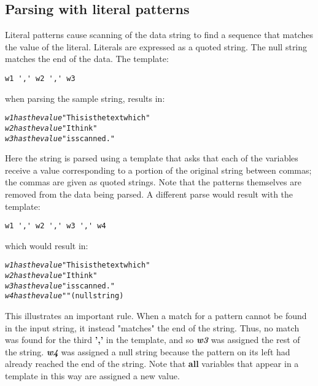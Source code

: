 \subsection{Parsing with literal patterns}
\index{,}
\index{,}
 Literal patterns cause scanning of the data string to find a
sequence that matches the value of the literal.  Literals are expressed
as a quoted string.  The null string matches the end of the data.
 The template:
\begin{lstlisting}
w1 ',' w2 ',' w3
\end{lstlisting}
when parsing the sample string, results in:
\begin{alltt}
\emph{w1} \emph{has the value} "This is  the text which"
\emph{w2} \emph{has the value} " I think"
\emph{w3} \emph{has the value} "  is scanned."
\end{alltt}
 Here the string is parsed using a template that asks that each of
the variables receive a value corresponding to a portion of the
original string between commas; the commas are given as quoted strings.
Note that the patterns themselves are removed from the data being
parsed.
 A different parse would result with the template:
\begin{lstlisting}
w1 ',' w2 ',' w3 ',' w4
\end{lstlisting}
which would result in:
\begin{alltt}
\emph{w1} \emph{has the value} "This is  the text which"
\emph{w2} \emph{has the value} " I think"
\emph{w3} \emph{has the value} "  is scanned."
\emph{w4} \emph{has the value} ""  (null string)
\end{alltt}
 This illustrates an important rule.  When a match for a pattern
cannot be found in the input string, it instead "matches" the end
of the string.  Thus, no match was found for the third \textbf{','} in
the template, and so \textbf{\emph{w3}} was assigned the rest of
the string. \textbf{\emph{w4}} was assigned a null string
because the pattern on its left had already reached the end of the
string.
 Note that \textbf{all} variables that appear in a template in this
way are assigned a new value.
